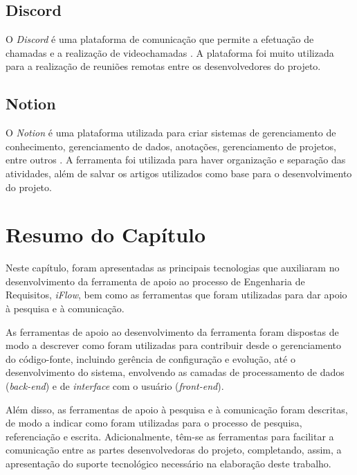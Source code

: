 \subsection{Discord}
O \textit{Discord} é uma plataforma de comunicação que permite a efetuação de chamadas e a realização de videochamadas \cite{discord}. A plataforma foi muito utilizada para a realização de reuniões remotas entre os desenvolvedores do projeto.

\subsection{Notion}
O \textit{Notion} é uma plataforma utilizada para criar sistemas de gerenciamento de conhecimento, gerenciamento de dados, anotações, gerenciamento de projetos, entre outros \cite{notion}. A ferramenta foi utilizada para haver organização e separação das atividades, além de salvar os artigos utilizados como base para o desenvolvimento do projeto.

\section{Resumo do Capítulo}

\label{sec_tec_resumo}

Neste capítulo, foram apresentadas as principais tecnologias que auxiliaram no desenvolvimento da ferramenta de apoio ao processo de Engenharia de Requisitos, \textit{iFlow}, bem como as ferramentas que foram utilizadas para dar apoio à pesquisa e à comunicação.

As ferramentas de apoio ao desenvolvimento da ferramenta foram dispostas de modo a descrever como foram utilizadas para contribuir desde o gerenciamento do código-fonte, incluindo gerência de configuração e evolução, até o desenvolvimento do sistema, envolvendo as camadas de processamento de dados (\textit{back-end}) e de \textit{interface} com o usuário (\textit{front-end}).

Além disso, as ferramentas de apoio à pesquisa e à comunicação foram descritas, de modo a indicar como foram utilizadas para o processo de pesquisa, referenciação e escrita. Adicionalmente, têm-se as ferramentas para facilitar a comunicação entre as partes desenvolvedoras do projeto, completando, assim, a apresentação do suporte tecnológico necessário na elaboração deste trabalho.